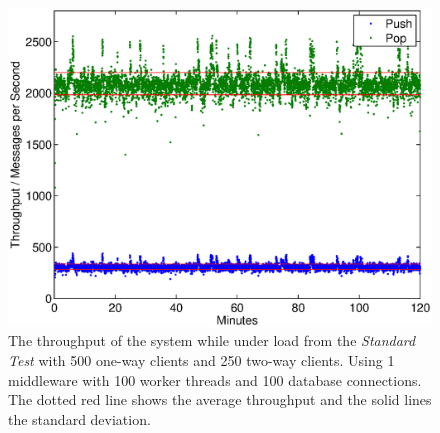 \documentclass{article}
\begin{document}
            \begin{figure}[H]
                \hspace{-1.5cm}
                \includegraphics[scale=0.750]{2h_100threads_standardTest_500_250}
                \caption{The throughput of the system while under load from the \textit{Standard Test} with 500 one-way clients and 250 two-way clients. Using 1 middleware with 100 worker threads and 100 database connections. The dotted red line shows the average throughput and the solid lines the standard deviation.}
                \label{fig:2h_100threads_standardTest_500_250}
            \end{figure}
\end{document}
